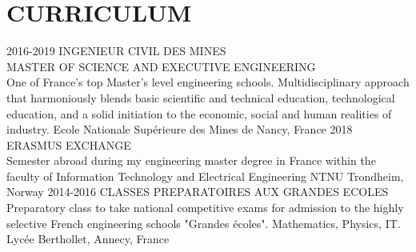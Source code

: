 \documentclass[]{cv-style}          %
\begin{document}
\section{CURRICULUM}
%
\begin{entrylist}
\entry
{2016-2019}
{INGENIEUR CIVIL DES MINES \\ MASTER OF SCIENCE AND EXECUTIVE ENGINEERING\\
{\normalfont 
One of France's top Master’s level engineering schools.
Multidisciplinary approach that harmoniously blends basic scientific and technical education, technological education, and a solid initiation to the economic, social and human realities of industry. \hspace{11cm}}}
{Ecole Nationale Supérieure des Mines de Nancy, France}
{\vspace{-0.3cm}}
\entry
{2018}
{ERASMUS EXCHANGE \\{\normalfont 
Semester abroad during my engineering master degree in France within the faculty of Information Technology and Electrical Engineering\hspace{4cm}}}
{NTNU Trondheim, Norway}
{\vspace{-0.3cm}}
\entry
{2014-2016}
{CLASSES PREPARATOIRES AUX GRANDES ECOLES \\{\normalfont Preparatory class to take national competitive exams for admission to the highly selective French engineering schools "Grandes écoles". Mathematics, Physics, IT.}}
{Lycée Berthollet, Annecy, France}
{}
\end{entrylist}
%
%
\vspace{-0.6cm}
\end{document}
